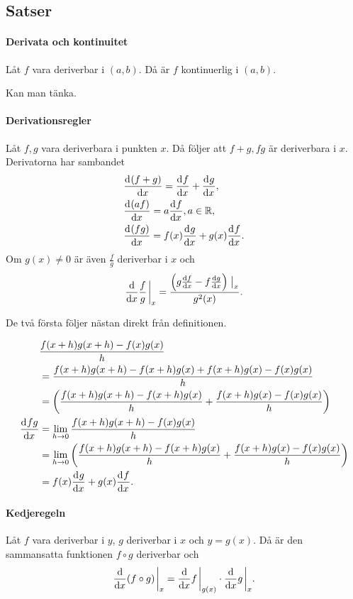 \subsection{Satser}

\paragraph{Derivata och kontinuitet}
Låt $f$ vara deriverbar i $(a, b)$. Då är $f$ kontinuerlig i $(a, b)$.

\proof
Kan man tänka.

\paragraph{Derivationsregler}
Låt $f, g$ vara deriverbara i punkten $x$. Då följer att $f + g, fg$ är deriverbara i $x$. Derivatorna har sambandet
\begin{align*}
	&\dv[]{(f + g)}{x} (x) = \dv[]{f}{x} (x) + \dv[]{g}{x} (x), \\
	&\dv[]{(af)}{x} (x) = a\dv[]{f}{x} (x), a\in\mathbb{R}, \\
	&\dv[]{(fg)}{x} (x) = f(x)\dv[]{g}{x} (x) + g(x)\dv[]{f}{x} (x). \\
\end{align*}
Om $g(x)\neq 0$ är även $\frac{f}{g}$ deriverbar i $x$ och
\begin{align*}
	\dv{x}\frac{f}{g}\eval_x = \frac{\left(g\dv{f}{x} - f\dv{g}{x}\right)\eval_x}{g^2(x)}.
\end{align*}

\proof
De två första följer nästan direkt från definitionen.

\begin{align*}
	                 &\frac{f(x + h)g(x + h) - f(x)g(x)}{h} \\
	                 &= \frac{f(x + h)g(x + h) - f(x + h)g(x) + f(x + h)g(x) - f(x)g(x)}{h} \\
	                 &= \left(\frac{f(x + h)g(x + h) - f(x + h)g(x)}{h} + \frac{f(x + h)g(x) - f(x)g(x)}{h}\right) \\
	\dv[]{fg}{x} (x) &= \lim\limits_{h\to 0}\frac{f(x + h)g(x + h) - f(x)g(x)}{h} \\
	                 &= \lim\limits_{h\to 0}\left(\frac{f(x + h)g(x + h) - f(x + h)g(x)}{h} + \frac{f(x + h)g(x) - f(x)g(x)}{h}\right) \\
	                 &= f(x)\dv[]{g}{x} (x) + g(x)\dv[]{f}{x} (x).
\end{align*}

\paragraph{Kedjeregeln}
Låt $f$ vara deriverbar i $y$, $g$ deriverbar i $x$ och $y = g(x)$. Då är den sammansatta funktionen $f\circ g$ deriverbar och
\begin{align*}
	\dv{x}(f\circ g)\eval_x = \dv{x}f\eval_{g(x)}\cdot\dv{x}g\eval_x.
\end{align*}

